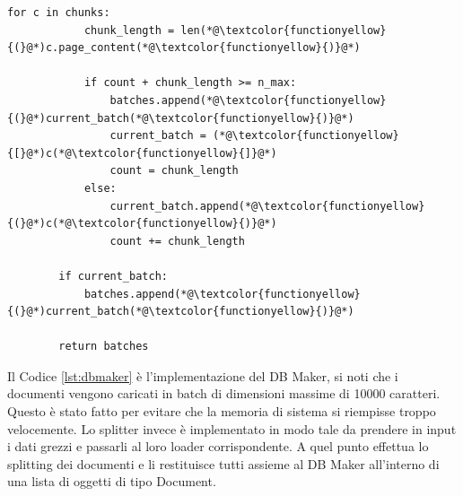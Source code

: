 \begin{lstlisting}[label=lst:dbmaker, caption={Implementazione del DB Maker}]
        for c in chunks:
            chunk_length = len(*@\textcolor{functionyellow}{(}@*)c.page_content(*@\textcolor{functionyellow}{)}@*)
            
            if count + chunk_length >= n_max:
                batches.append(*@\textcolor{functionyellow}{(}@*)current_batch(*@\textcolor{functionyellow}{)}@*)
                current_batch = (*@\textcolor{functionyellow}{[}@*)c(*@\textcolor{functionyellow}{]}@*)
                count = chunk_length
            else:
                current_batch.append(*@\textcolor{functionyellow}{(}@*)c(*@\textcolor{functionyellow}{)}@*)
                count += chunk_length

        if current_batch:
            batches.append(*@\textcolor{functionyellow}{(}@*)current_batch(*@\textcolor{functionyellow}{)}@*)
        
        return batches
\end{lstlisting}
Il Codice \ref{lst:dbmaker} è l'implementazione del DB Maker, si noti che i documenti vengono caricati in batch di dimensioni massime di 10000 caratteri. Questo è stato fatto per evitare che la memoria di sistema si riempisse troppo velocemente.
Lo splitter invece è implementato in modo tale da prendere in input i dati grezzi e passarli al loro loader corrispondente. A quel punto effettua lo splitting dei documenti e li restituisce tutti assieme al DB Maker all'interno di una lista di oggetti di tipo Document.
